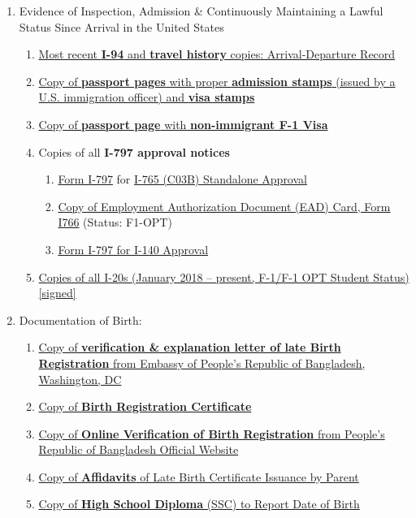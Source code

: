 \begin{enumerate}[label=\textbf{ Exhibit-\arabic*}]
    \item Evidence of Inspection, Admission \& Continuously Maintaining a Lawful Status Since Arrival in the United States
    \begin{enumerate}[label=\roman*.]
        \item \hyperref[exhibit6c]{Most recent \textbf{I-94} and \textbf{travel history} copies: Arrival-Departure Record}
        \item \hyperref[exhibit6a]{Copy of \textbf{passport pages} with proper \textbf{admission stamps} (issued by a U.S. immigration officer) and \textbf{visa stamps} }
        \item \hyperref[exhibit6b]{Copy of \textbf{passport page} with \textbf{non-immigrant F-1 Visa}}
        
        \item Copies of all \textbf{I-797 approval notices} \begin{enumerate}[label=\alph*.]
            \item \hyperref[exhibit6d]{Form I-797} for \hyperref[exhibit8e]{I-765 (C03B) Standalone Approval}
            \item \hyperref[exhibit6da3]{Copy of Employment Authorization Document (EAD) Card, Form I766} (Status: F1-OPT)
            \item \hyperref[exhibit1]{Form I-797 for I-140 Approval}
        \end{enumerate}
        
    \item \hyperref[exhibit6e]{Copies of all I-20s (January 2018 – present, F-1/F-1 OPT Student Status) [signed]}
    
    \end{enumerate}

     \item Documentation of Birth:
    \begin{enumerate}[label=\roman*.]
        \item \hyperref[exhibit5a]{Copy of \textbf{verification \& explanation letter of late Birth Registration} from Embassy of People's Republic of Bangladesh, Washington, DC}
        \item \hyperref[exhibit5b]{Copy of \textbf{Birth Registration Certificate}}
        \item \hyperref[exhibit5c]{Copy of \textbf{Online Verification of Birth Registration} from People's Republic of Bangladesh Official Website}
        \item \hyperref[exhibit5d]{Copy of \textbf{Affidavits} of Late Birth Certificate Issuance by Parent}
        \item \hyperref[exhibit5e]{Copy of \textbf{High School Diploma} (SSC) to Report Date of Birth}
    \end{enumerate}
    

\end{enumerate}
